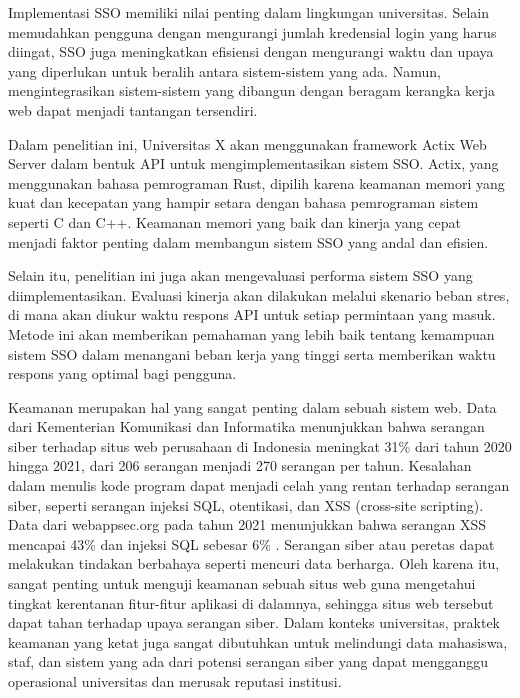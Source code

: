 \documentclass{article}
\begin{document}
Implementasi SSO memiliki nilai penting dalam lingkungan universitas. Selain memudahkan pengguna dengan mengurangi jumlah kredensial login yang harus diingat, SSO juga meningkatkan efisiensi dengan mengurangi waktu dan upaya yang diperlukan untuk beralih antara sistem-sistem yang ada. Namun, mengintegrasikan sistem-sistem yang dibangun dengan beragam kerangka kerja web dapat menjadi tantangan tersendiri.

Dalam penelitian ini, Universitas X akan menggunakan framework Actix Web Server dalam bentuk API untuk mengimplementasikan sistem SSO. Actix, yang menggunakan bahasa pemrograman Rust, dipilih karena keamanan memori yang kuat dan kecepatan yang hampir setara dengan bahasa pemrograman sistem seperti C dan C++. Keamanan memori yang baik dan kinerja yang cepat menjadi faktor penting dalam membangun sistem SSO yang andal dan efisien\cite{kyriakou2022complementing}.

Selain itu, penelitian ini juga akan mengevaluasi performa sistem SSO yang diimplementasikan. Evaluasi kinerja akan dilakukan melalui skenario beban stres\cite{ComparativeAnaWaluyo2022}, di mana akan diukur waktu respons API untuk setiap permintaan yang masuk. Metode ini akan memberikan pemahaman yang lebih baik tentang kemampuan sistem SSO dalam menangani beban kerja yang tinggi serta memberikan waktu respons yang optimal bagi pengguna.

Keamanan merupakan hal yang sangat penting dalam sebuah sistem web. Data dari Kementerian Komunikasi dan Informatika menunjukkan bahwa serangan siber terhadap situs web perusahaan di Indonesia meningkat 31\% dari tahun 2020 hingga 2021, dari 206 serangan menjadi 270 serangan per tahun. Kesalahan dalam menulis kode program dapat menjadi celah yang rentan terhadap serangan siber, seperti serangan injeksi SQL, otentikasi, dan XSS (cross-site scripting). Data dari webappsec.org pada tahun 2021 menunjukkan bahwa serangan XSS mencapai 43\% dan injeksi SQL sebesar 6\% . Serangan siber atau peretas dapat melakukan tindakan berbahaya seperti mencuri data berharga. Oleh karena itu, sangat penting untuk menguji keamanan sebuah situs web guna mengetahui tingkat kerentanan fitur-fitur aplikasi di dalamnya, sehingga situs web tersebut dapat tahan terhadap upaya serangan siber. Dalam konteks universitas, praktek keamanan yang ketat juga sangat dibutuhkan untuk melindungi data mahasiswa, staf, dan sistem yang ada dari potensi serangan siber yang dapat mengganggu operasional universitas dan merusak reputasi institusi\cite{Priyawati2022WebsiteVT}.
\end{document}
